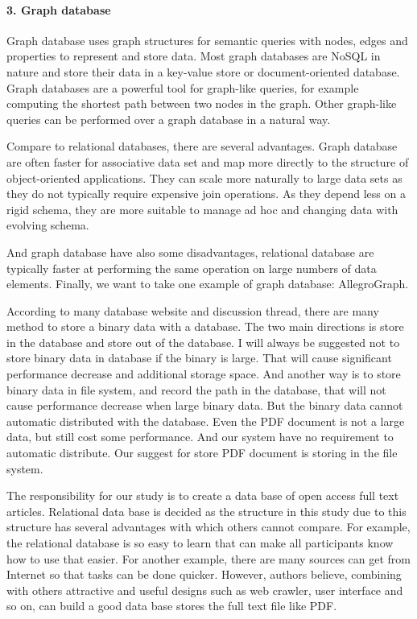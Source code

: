 \paragraph{3. Graph database}
Graph database uses graph structures for semantic queries with nodes,  edges and properties to represent and store data. Most graph databases are NoSQL in nature and store their data in a key-value store or document-oriented database. Graph databases are a powerful tool for graph-like queries, for example computing the shortest path between two nodes in the graph. Other graph-like queries can be performed over a graph database in a natural way.

Compare to relational databases, there are several advantages. Graph database are often faster for associative data set and map more directly to the structure of object-oriented applications. They can scale more naturally to large data sets as they do not typically require expensive join operations. As they depend less on a rigid schema, they are more suitable to manage ad hoc and changing data with evolving schema.

And graph database have also some disadvantages, relational database are typically faster at performing the same operation on large numbers of data elements. Finally, we want to take one example of graph database: AllegroGraph. 


According to many database website and discussion thread, there are many method to store a binary data with a database. The two main directions is store in the database and store out of the database. I will always be suggested not to store binary data in database if the binary is large. That will cause significant performance decrease and additional storage space. And another way is to store binary data in file system, and record the path in the database, that will not cause performance decrease when large binary data. But the binary data cannot automatic distributed with the database. Even the PDF document is not a large data, but still cost some performance. And our system have no requirement to automatic distribute. Our suggest for store PDF document is storing in the file system.

The responsibility for our study is to create a data base of open access full text articles. Relational data base is decided as the structure in this study due to this structure has several advantages with which others cannot compare. For example, the relational database is so easy to learn that can make all participants know how to use that easier. For another example, there are many sources can get from Internet so that tasks can be done quicker. However, authors believe, combining with others attractive and useful designs such as web crawler, user interface and so on, can build a good data base stores the full text file like PDF.\\\\\\

